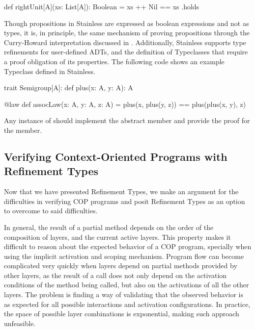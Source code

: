 \begin{scala}
  def rightUnit[A](xs: List[A]): Boolean = {
    xs ++ Nil == xs
  }.holds
\end{scala}

Though propositions in Stainless are expressed as boolean expressions and not as types, it is, in 
principle, the same mechanism of proving propositions through the Curry-Howard interpretation   
discussed in . Additionally, Stainless supports type refinements for 
user-defined \acp{ADT}, and the definition of Typeclasses that require a proof obligation of its 
properties. The following code shows an example  Typeclass defined in Stainless.

\begin{scala}
trait Semigroup[A]:
  def plus(x: A, y: A): A

  @law
  def assocLaw(x: A, y: A, z: A) =
    plus(x, plus(y, z)) == plus(plus(x, y), z)
\end{scala}

Any instance of  should implement the  abstract member and provide 
the proof for the  member.


\subsection{Verifying Context-Oriented Programs with Refinement Types}
\label{sec:problem-of-verifying-cop}

Now that we have presented Refinement Types, we make an argument for the difficulties in verifying 
\ac{COP} programs and posit Refinement Types as an option to overcome to said difficulties.

In general, the result of a partial method depends on the order of the composition of layers, and the 
current active layers. This property makes it difficult to reason about the expected behavior of a 
\ac{COP} program, specially when using the implicit activation and scoping mechanism. 
Program flow can become complicated very quickly when layers depend on partial methods provided 
by other layers, as the result of a call does not only depend on the activation conditions of the  
method being called, but also on the activations of all the other layers. The problem is finding  a way of 
validating that the observed behavior is as expected for all possible interactions and activation 
configurations. In practice, the space of possible layer combinations is exponential, making such 
approach unfeasible.

